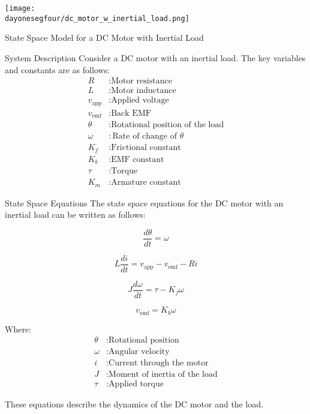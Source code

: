 
\begin{frame}
	\begin{center}
		\texttt{[image: \\dayonesegfour/dc\_motor\_w\_inertial\_load.png]}
	\end{center}
\end{frame}



	
	\begin{frame}{State Space Model for a DC Motor with Inertial Load}
		
		\begin{block}{System Description}
			Consider a DC motor with an inertial load. The key variables and constants are as follows:
			\begin{align*}
			R & : \text{Motor resistance} \\
			L & : \text{Motor inductance} \\
			v_{\text{app}} & : \text{Applied voltage} \\
			v_{\text{emf}} & : \text{Back EMF} \\
			\theta & : \text{Rotational position of the load} \\
			\omega & : \text{Rate of change of }\theta \\
			K_f & : \text{Frictional constant} \\
			K_b & : \text{EMF constant} \\
			\tau & : \text{Torque} \\
			K_m & : \text{Armature constant}
			\end{align*}
		\end{block}
		
	\end{frame}
	
	\begin{frame}{State Space Equations}
		The state space equations for the DC motor with an inertial load can be written as follows:
		
		\[
		\frac{d\theta}{dt} = \omega
		\]
		
		\[
		L\frac{di}{dt} = v_{\text{app}} - v_{\text{emf}} - Ri
		\]
		
		\[
		J\frac{d\omega}{dt} = \tau - K_f\omega
		\]
		
		\[
		v_{\text{emf}} = K_b\omega
		\]
		
		Where:
		\begin{align*}
		\theta & : \text{Rotational position} \\
		\omega & : \text{Angular velocity} \\
		i & : \text{Current through the motor} \\
		J & : \text{Moment of inertia of the load} \\
		\tau & : \text{Applied torque}
		\end{align*}
		
		These equations describe the dynamics of the DC motor and the load.
	\end{frame}
	
